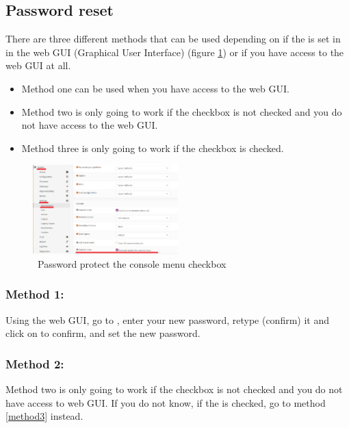 \subsection{Password reset}
There are three different methods that can be used depending on if the  is set in  in the web GUI (Graphical User Interface) (figure \ref{opensense:password_protect_CLI}) or if you have access to the web GUI at all.

\begin{itemize}
    \item Method one can be used when you have access to the web GUI.
    \item Method two is only going to work if the  checkbox is not checked and you do not have access to the web GUI.
    \item Method three is only going to work if the  checkbox is checked.
\end{itemize}

\begin{figure}[h!]
    \centering
    \includegraphics[width=0.5\textwidth]{Images/opensense_system_settings_administration_protect_cli.PNG}
    \caption{\opnsense\ Password protect the console menu checkbox}
    \label{opensense:password_protect_CLI}
\end{figure}

\subsubsection*{Method 1:}
Using the web GUI, go to , enter your new password, retype (confirm) it and click on  to confirm, and set the new password.

\subsubsection*{Method 2:}

\begin{importantblock}
    Method two is only going to work if the checkbox  is not checked and you do not have access to web GUI. If you do not know, if the  is checked, go to method \ref{method3} instead.
\end{importantblock}

